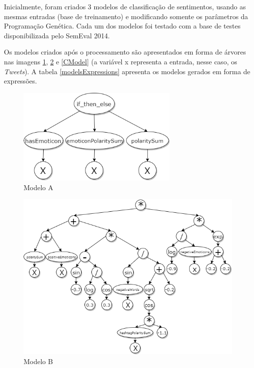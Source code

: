 \documentclass[12pt]{article}
\begin{document}
Inicialmente, foram criados 3 modelos de classificação de sentimentos, usando as mesmas entradas (base de treinamento) e modificando somente os parâmetros da Programação Genética. Cada um dos modelos foi testado com a base de testes disponibilizada pelo SemEval 2014.

Os modelos criados após o processamento são apresentados em forma de árvores nas imagens \ref{AModel}, \ref{BModel} e \ref{CModel} (a variável x representa a entrada, nesse caso, os \emph{Tweets}). A tabela \ref{modelsExpressions} apresenta os modelos gerados em forma de expressões.

	\begin{figure}[H]
		\centering
		\includegraphics[width=0.7\textwidth]{treeA2}
		\caption{Modelo A}
		\label{AModel}
	\end{figure}
	
	\begin{figure}[H]
		\centering
		\begin{adjustwidth}{-1cm}{}
		\includegraphics[width=1.2\textwidth]{treeB3}
		\caption{Modelo B}
		\label{BModel}
		\end{adjustwidth}
	\end{figure}
\end{document}
